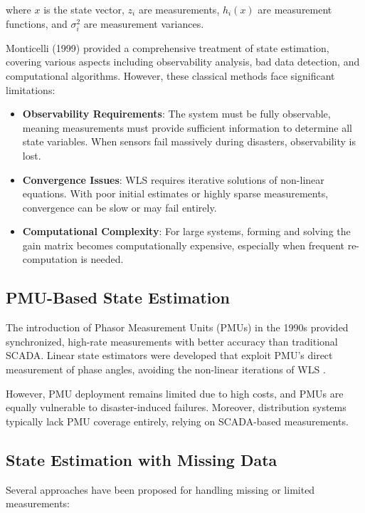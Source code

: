 \documentclass[12pt,a4paper]{report}
\begin{document}
where $x$ is the state vector, $z_i$ are measurements, $h_i(x)$ are measurement functions, and $\sigma_i^2$ are measurement variances.

Monticelli (1999) \cite{monticelli1999} provided a comprehensive treatment of state estimation, covering various aspects including observability analysis, bad data detection, and computational algorithms. However, these classical methods face significant limitations:

\begin{itemize}
    \item \textbf{Observability Requirements}: The system must be fully observable, meaning measurements must provide sufficient information to determine all state variables. When sensors fail massively during disasters, observability is lost.
    
    \item \textbf{Convergence Issues}: WLS requires iterative solutions of non-linear equations. With poor initial estimates or highly sparse measurements, convergence can be slow or may fail entirely.
    
    \item \textbf{Computational Complexity}: For large systems, forming and solving the gain matrix becomes computationally expensive, especially when frequent re-computation is needed.
\end{itemize}

\subsection{PMU-Based State Estimation}

The introduction of Phasor Measurement Units (PMUs) in the 1990s provided synchronized, high-rate measurements with better accuracy than traditional SCADA. Linear state estimators were developed that exploit PMU's direct measurement of phase angles, avoiding the non-linear iterations of WLS \cite{phadke2008}.

However, PMU deployment remains limited due to high costs, and PMUs are equally vulnerable to disaster-induced failures. Moreover, distribution systems typically lack PMU coverage entirely, relying on SCADA-based measurements.

\subsection{State Estimation with Missing Data}

Several approaches have been proposed for handling missing or limited measurements:
\end{document}
